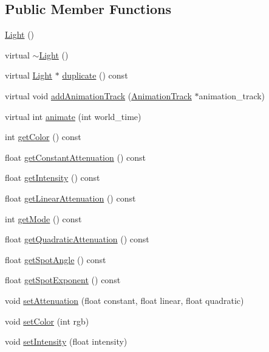 \subsection*{Public Member Functions}
\begin{CompactItemize}
\item 
\hyperlink{classm3g_1_1Light_7f8a7be05225f470c200f7e4ff914a3c}{Light} ()
\item 
virtual \hyperlink{classm3g_1_1Light_f50d3d8cdb323e1a9fbd7bfac3aeba06}{$\sim$Light} ()
\item 
virtual \hyperlink{classm3g_1_1Light}{Light} $\ast$ \hyperlink{classm3g_1_1Light_7a41af040d0c1566358d84f089cd0cd1}{duplicate} () const 
\item 
virtual void \hyperlink{classm3g_1_1Light_415c0b110f95410ded9b85e5d99a496b}{addAnimationTrack} (\hyperlink{classm3g_1_1AnimationTrack}{AnimationTrack} $\ast$animation\_\-track)
\item 
virtual int \hyperlink{classm3g_1_1Light_8aad1ceab4c2a03609c8a42324ce484d}{animate} (int world\_\-time)
\item 
int \hyperlink{classm3g_1_1Light_4cfa1931c265ec3412fe3f6408a1b4f5}{getColor} () const 
\item 
float \hyperlink{classm3g_1_1Light_9553ab96cb7639acafcebb81888af687}{getConstantAttenuation} () const 
\item 
float \hyperlink{classm3g_1_1Light_ca846da41d09a6ae01d6b362c33e938d}{getIntensity} () const 
\item 
float \hyperlink{classm3g_1_1Light_50e949b0cc2014e576987379cac07769}{getLinearAttenuation} () const 
\item 
int \hyperlink{classm3g_1_1Light_d4ce4524e4751fe5e3cfb8c270347d54}{getMode} () const 
\item 
float \hyperlink{classm3g_1_1Light_9ec7130ca1977cfeb4b2cbebc31971b4}{getQuadraticAttenuation} () const 
\item 
float \hyperlink{classm3g_1_1Light_1117f914d754fe74c090dc97bde905eb}{getSpotAngle} () const 
\item 
float \hyperlink{classm3g_1_1Light_a359fee191741efb7e576616a59a76f7}{getSpotExponent} () const 
\item 
void \hyperlink{classm3g_1_1Light_391c5cff137fc2e810f5129a5381196f}{setAttenuation} (float constant, float linear, float quadratic)
\item 
void \hyperlink{classm3g_1_1Light_b1f5cc0f5cc6bbbd716a526c61f1081d}{setColor} (int rgb)
\item 
void \hyperlink{classm3g_1_1Light_ce02325cb6289c007d569c193641c468}{setIntensity} (float intensity)

\end{CompactItemize}
